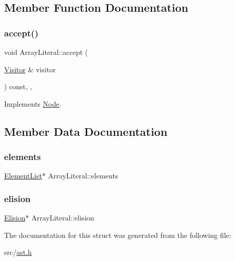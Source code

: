 \subsection{Member Function Documentation}
\mbox{\label{struct_array_literal_ab3ba06d627e0fe714aafb9fc843c83e8}} 
\subsubsection{\texorpdfstring{accept()}{accept()}}
{\footnotesize\ttfamily void Array\+Literal\+::accept (\begin{DoxyParamCaption}\item[{\hyperlink{struct_visitor}{Visitor} \&}]{visitor }\end{DoxyParamCaption}) const\hspace{0.3cm}{\ttfamily [inline]}, {\ttfamily [override]}, {\ttfamily [virtual]}}



Implements \hyperlink{struct_node_a10bd7af968140bbf5fa461298a969c71}{Node}.



\subsection{Member Data Documentation}
\mbox{\label{struct_array_literal_ae4c3df364c3994cb8916d73a50f1f92f}} 
\subsubsection{\texorpdfstring{elements}{elements}}
{\footnotesize\ttfamily \hyperlink{struct_element_list}{Element\+List}$\ast$ Array\+Literal\+::elements}

\mbox{\label{struct_array_literal_a08fa9ad6e83376bb2a70d22df9cf2c8a}} 
\subsubsection{\texorpdfstring{elision}{elision}}
{\footnotesize\ttfamily \hyperlink{struct_elision}{Elision}$\ast$ Array\+Literal\+::elision}



The documentation for this struct was generated from the following file\+:\begin{DoxyCompactItemize}
\item 
src/\hyperlink{ast_8h}{ast.\+h}\end{DoxyCompactItemize}
